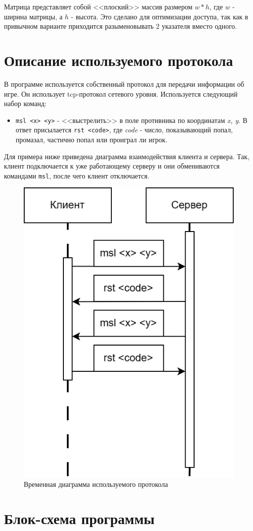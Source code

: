 Матрица представляет собой <<плоский>> массив размером $w * h$, где $w$ - ширина
матрицы, а $h$ - высота. Это сделано для оптимизации доступа, так как в
привычном варианте приходится разыменовывать 2 указателя вместо одного.

\newpage

\section*{Описание используемого протокола}

В программе используется собственный протокол для передачи информации об игре.
Он использует tcp-протокол сетевого уровня. Используется следующий набор
команд:

\begin{itemize}
    \item \texttt{msl <x> <y>} - <<выстрелить>> в поле противника по координатам
          \emph{x, y}. В ответ присылается \texttt{rst <code>}, где \emph{code}
          - число, показывающий попал, промазал, частично попал или проиграл ли игрок.
\end{itemize}

Для примера ниже приведена диаграмма взаимодействия клиента и сервера. Так,
клиент подключается к уже работающему серверу и они обмениваются командами
\texttt{msl}, после чего клиент отключается.

\begin{figure}[H]
    \centering
    \includegraphics[width=0.4\linewidth]{images/lab3_sequence.drawio.png}
    \caption{Временная диаграмма используемого протокола}
    \label{fig:sequence}
\end{figure}

\newpage

\section*{Блок-схема программы}

